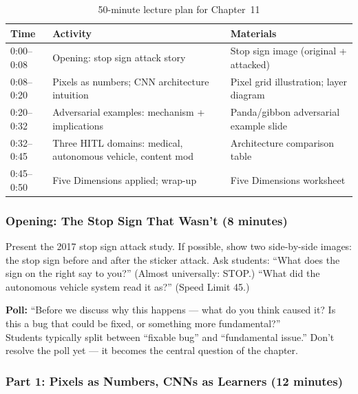 \begin{table}[htbp]
\caption{50-minute lecture plan for Chapter~11}
\label{tab:lecture-plan-ch11}
\centering
\begin{tabular}{@{}p{2.5cm}p{6cm}p{3.5cm}@{}}
\toprule
\textbf{Time} & \textbf{Activity} & \textbf{Materials} \\
\midrule
0:00--0:08 & Opening: stop sign attack story & Stop sign image (original + attacked) \\
0:08--0:20 & Pixels as numbers; CNN architecture intuition & Pixel grid illustration; layer diagram \\
0:20--0:32 & Adversarial examples: mechanism + implications & Panda/gibbon adversarial example slide \\
0:32--0:45 & Three HITL domains: medical, autonomous vehicle, content mod & Architecture comparison table \\
0:45--0:50 & Five Dimensions applied; wrap-up & Five Dimensions worksheet \\
\bottomrule
\end{tabular}
\end{table}

\subsubsection{Opening: The Stop Sign That Wasn't (8 minutes)}

Present the 2017 stop sign attack study. If possible, show two side-by-side images: the stop sign before and after the sticker attack. Ask students: ``What does the sign on the right say to you?'' (Almost universally: STOP.) ``What did the autonomous vehicle system read it as?'' (Speed Limit 45.)

\begin{trythis}
\textbf{Poll:} ``Before we discuss why this happens --- what do you think caused it? Is this a bug that could be fixed, or something more fundamental?''\\[0.5em]
Students typically split between ``fixable bug'' and ``fundamental issue.'' Don't resolve the poll yet --- it becomes the central question of the chapter.
\end{trythis}

\subsubsection{Part 1: Pixels as Numbers, CNNs as Learners (12 minutes)}

